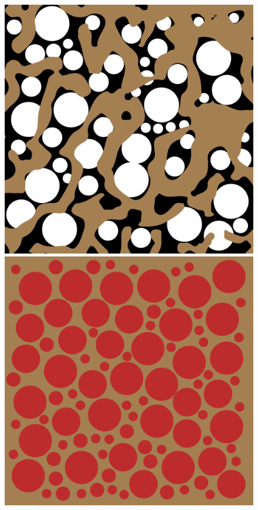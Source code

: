 \documentclass[a4paper,num-refs]{oup-contemporary}
\begin{document}
\begin{figure}
\begin{center}
\begin{minipage}[c]{0.24\linewidth}
			\newline
	\end{minipage}
	\begin{minipage}[c]{0.24\linewidth}
		\centering
		\includegraphics[width=\linewidth]{real_mesh_n2.png}
		\newline
	\end{minipage}
\hfill
	\begin{minipage}[b]{0.24\linewidth}
		\includegraphics[width=\linewidth]{mesh_100.png}

\end{minipage}
\end{center}
\end{figure}
\end{document}
